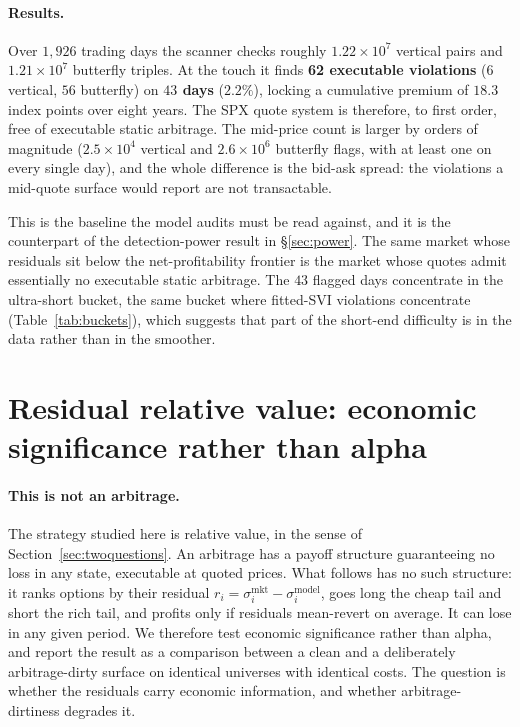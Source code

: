 \paragraph{Results.} Over $1{,}926$ trading days the scanner checks roughly $1.22\times10^7$
vertical pairs and $1.21\times10^7$ butterfly triples. At the touch it finds \textbf{62
executable violations} ($6$ vertical, $56$ butterfly) on \textbf{$43$ days} ($2.2\%$), locking
a cumulative premium of $18.3$ index points over eight years. The SPX quote system is
therefore, to first order, free of executable static arbitrage. The mid-price count is larger
by orders of magnitude ($2.5\times10^4$ vertical and $2.6\times10^6$ butterfly flags, with at
least one on every single day), and the whole difference is the bid-ask spread: the violations
a mid-quote surface would report are not transactable.

This is the baseline the model audits must be read against, and it is the counterpart of the
detection-power result in \S\ref{sec:power}. The same market whose residuals sit below the
net-profitability frontier is the market whose quotes admit essentially no executable static
arbitrage. The $43$ flagged days concentrate in the ultra-short bucket, the same bucket where
fitted-SVI violations concentrate (Table~\ref{tab:buckets}), which suggests that part of the
short-end difficulty is in the data rather than in the smoother.

\section{Residual relative value: economic significance rather than alpha}\label{sec:residual}

\paragraph{This is not an arbitrage.} The strategy studied here is relative value, in the sense
of Section~\ref{sec:twoquestions}. An arbitrage has a payoff structure guaranteeing no loss in
any state, executable at quoted prices. What follows has no such structure: it ranks options by
their residual $r_i=\sigma^{\mathrm{mkt}}_i-\sigma^{\mathrm{model}}_i$, goes long the cheap tail
and short the rich tail, and profits only if residuals mean-revert on average. It can lose in
any given period. We therefore test economic significance rather than alpha, and report the
result as a comparison between a clean and a deliberately arbitrage-dirty surface on identical
universes with identical costs. The question is whether the residuals carry economic
information, and whether arbitrage-dirtiness degrades it.

